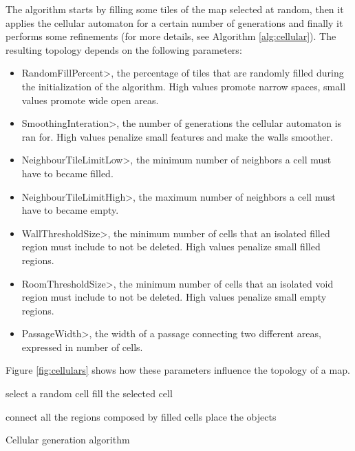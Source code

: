 \par

The algorithm starts by filling some tiles of the map selected at random, then it applies the cellular automaton for a certain number of generations and finally it performs some refinements (for more details, see Algorithm \ref{alg:cellular}). The resulting topology depends on the following parameters:

\begin{itemize}
\item \<RandomFillPercent>, the percentage of tiles that are randomly filled during the initialization of the algorithm. High values promote narrow spaces, small values promote wide open areas.
\item \<SmoothingInteration>, the number of generations the cellular automaton is ran for. High values penalize small features and make the walls smoother. 
\item \<NeighbourTileLimitLow>, the minimum number of neighbors a cell must have to became filled.
\item \<NeighbourTileLimitHigh>, the maximum number of neighbors a cell must have to became empty.
\item \<WallThresholdSize>, the minimum number of cells that an isolated filled region must include to not be deleted. High  values penalize small filled regions.
\item \<RoomThresholdSize>, the minimum number of cells that an isolated void region must include to not be deleted. High  values penalize small empty regions.
\item \<PassageWidth>, the width of a passage connecting two different areas, expressed in number of cells.
\end{itemize}

\par

Figure \ref{fig:cellulars} shows how these parameters influence the topology of a map.

\begin{algorithm}[tp]
\SetAlgoLined


 {
	select a random cell\;
	fill the selected cell\;
}

 {
}



connect all the regions composed by filled cells\;
place the objects\;

\caption{Cellular generation algorithm}
\label{alg:cellular}
\end{algorithm}

